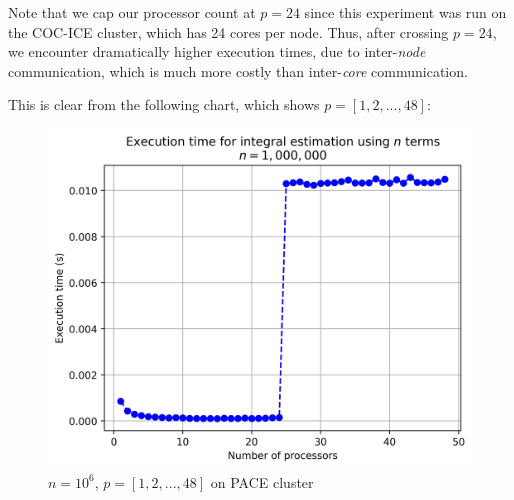 \documentclass{article}
\begin{document}
\hbox{}

Note that we cap our processor count at $p=24$ since this experiment was run on the COC-ICE cluster, which has 24 cores per node.
Thus, after crossing $p=24$, we encounter dramatically higher execution times, due to inter-\textit{node} communication, which is much more costly than inter-\textit{core} communication.

This is clear from the following chart, which shows $p=[1,2,...,48]$:

\begin{figure}[htb]
    \centering \includegraphics[width=\textwidth]{report_chart_n_1M_p_48_PACE.jpg}
    \caption{$n=10^6$, $p=[1,2,...,48]$ on PACE cluster}
    \label{fig:figure2}
\end{figure}
\end{document}
